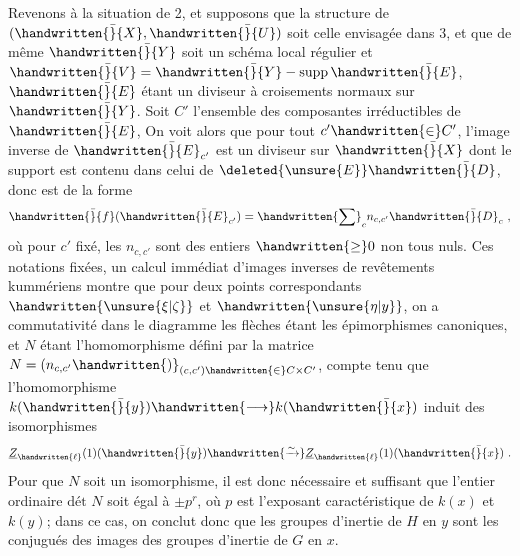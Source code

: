  Revenons à la situation de 2, et supposons que la structure de $(\handwritten{\bar}{X},\handwritten{\bar}{U})$ soit celle envisagée dans 3, et que de même $\handwritten{\bar}{Y}$ soit un schéma local régulier et $\handwritten{\bar}{V}=\handwritten{\bar}{Y}-\operatorname{supp}\handwritten{\bar}{E}$, $\handwritten{\bar}{E}$ étant un diviseur à croisements normaux sur $\handwritten{\bar}{Y}$. Soit $C'$ l'ensemble des composantes irréductibles de $\handwritten{\bar}{E}$, On voit alors que pour tout $c'\handwritten{\in}C'$, l'image inverse de $\handwritten{\bar}{E}_{c'}$ est un diviseur sur $\handwritten{\bar}{X}$ dont le support est contenu dans celui de $\deleted{\unsure{E}}\handwritten{\bar}{D}$, donc est de la forme
\[
\handwritten{\bar}{f}(\handwritten{\bar}{E}_{c'})=\handwritten{\sum}_{c}n_{c,c'}\handwritten{\bar}{D}_c\ ,
\]
où pour $c'$ fixé, les $n_{c,c'}$ sont des entiers $\handwritten{\geq}0$ non tous nuls. Ces notations fixées, un calcul immédiat  d'images inverses de revêtements kummériens montre que pour deux points correspondants $\handwritten{\unsure{\xi|\zeta}}$ et $\handwritten{\unsure{\eta|y}}$,  on a commutativité dans le diagramme
les flèches  étant les épimorphismes canoniques, et $N$ étant l'homomorphisme défini par la matrice $N=(n_{c,c'}\handwritten{)}_{(c,c')\handwritten{\in}C\mathbin{\times}C'}$, compte tenu que l'homomorphisme $k(\handwritten{\bar}{y})\handwritten{\longrightarrow}k(\handwritten{\bar}{x})$ induit des isomorphismes
\[
\underline{Z}_{\handwritten{\ell}}(1)(\handwritten{\bar}{y})\handwritten{\xrightarrow{\sim}}\underline{Z}_{\handwritten{\ell}}(1)(\handwritten{\bar}{x})\ .
\]
Pour que  $N$ soit un isomorphisme, il est donc nécessaire et suffisant que   l'entier ordinaire $\text{dét }N$ soit égal à $\pm p^r$, où $p$ est l'exposant caractéristique de $k(x)$ et $k(y)$; dans ce cas, on conclut donc que les groupes d'inertie de $H$ en $y$ sont les conjugués des images des groupes d'inertie de $G$ en $x$.

